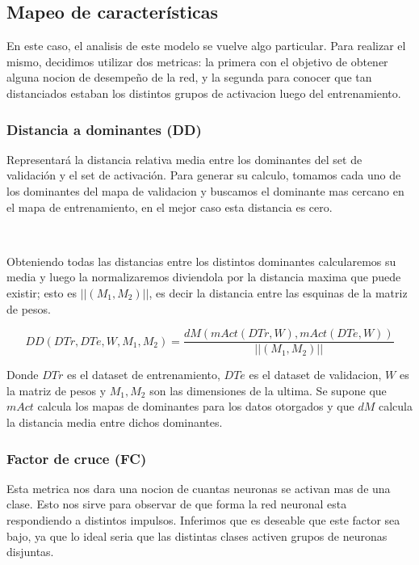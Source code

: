 \documentclass[informe.tex]{subfiles}
\begin{document}
      
    \subsection{Mapeo de características}
    
      En este caso, el analisis de este modelo se vuelve algo particular. Para realizar el mismo, decidimos utilizar dos metricas: la primera con el objetivo de obtener alguna nocion de desempe\~no de la red, y la segunda para conocer que tan distanciados estaban los distintos grupos de activacion luego del entrenamiento.
      
      \subsubsection{Distancia a dominantes (DD)}
      
      Representar\'a la distancia relativa media entre los dominantes del set de validaci\'on y el set de activaci\'on. Para generar su calculo, tomamos cada uno de los dominantes del mapa de validacion y buscamos el dominante mas cercano en el mapa de entrenamiento, en el mejor caso esta distancia es cero. 
      
      ~
      
      Obteniendo todas las distancias entre los distintos dominantes calcularemos su media y luego la normalizaremos diviendola por la distancia maxima que puede existir; esto es $||(M_1,M_2)||$, es decir la distancia entre las esquinas de la matriz de pesos.
      
      $$DD(DTr, DTe, W, M_1, M_2) = \frac{dM(mAct(DTr,W), mAct(DTe,W))}{||(M_1,M_2)||}$$
      
      Donde $DTr$ es el dataset de entrenamiento, $DTe$ es el dataset de validacion, $W$ es la matriz de pesos y $M_1, M_2$  son las dimensiones de la ultima. Se supone que $mAct$ calcula los mapas de dominantes para los datos otorgados y que $dM$ calcula la distancia media entre dichos dominantes.
      
      \subsubsection{Factor de cruce (FC)}
      
      Esta metrica nos dara una nocion de cuantas neuronas se activan mas de una clase. Esto nos sirve para observar de que forma la red neuronal esta respondiendo a distintos impulsos. Inferimos que es deseable que este factor sea bajo, ya que lo ideal seria que las distintas clases activen grupos de neuronas disjuntas.
      
\end{document}
